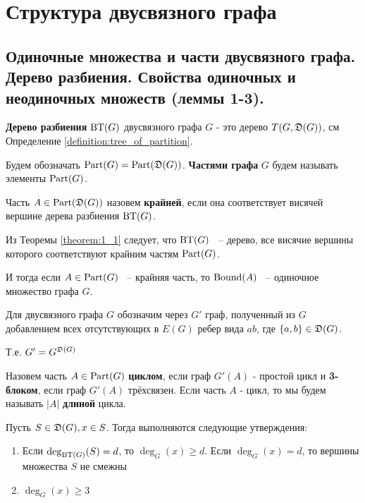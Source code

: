 
\section{Структура двусвязного графа}

\subsection{Одиночные множества и части двусвязного графа. Дерево разбиения. Свойства одиночных и неодиночных множеств (леммы 1-3).}


\begin{df*}
	\textbf{Дерево разбиения} $\operatorname{BT}(G)$ двусвязного графа  $G$ - это дерево  $T(G, \mathfrak{D}(G))$, см Определение \ref{definition:tree_of_partition}.

	Будем обозначать $\operatorname{Part}(G) = \operatorname{Part}(\mathfrak{D}(G))$.
	\textbf{Частями графа}  $G$ будем называть элементы  $\operatorname{Part}(G)$.
\end{df*}

\begin{df*}
	Часть $A \in \operatorname{Part}(\mathfrak{D}(G))$ назовем \textbf{крайней}, если она соответствует висячей вершине дерева разбиения  $\operatorname{BT}(G)$.
\end{df*}

Из Теоремы \ref{theorem:1_1} следует, что $\operatorname{BT}(G)$ ~-- дерево, все висячие вершины которого соответствуют крайним частям $\operatorname{Part}(G)$.

И тогда если $A \in \operatorname{Part}(G)$ ~-- крайняя часть, то $\operatorname{Bound}(A)$ ~-- одиночное множество графа $G$.

\begin{df*}[$G'$]
	Для двусвязного графа $G$ обозначим через $G'$ граф, полученный из $G$ добавлением всех отсутствующих в $E(G)$ ребер вида $ab$, где $\{a, b\} \in \mathfrak{D}(G)$.

	Т.е. $G' = G^{\mathfrak{D}(G)}$
\end{df*}

\begin{df*}
	Назовем часть $A \in \operatorname{Part}(G)$ \textbf{циклом}, если граф $G'(A)$ - простой цикл и \textbf{3-блоком}, если граф $G'(A)$ трёхсвязен.
	Если часть $A$ - цикл, то мы будем называть $|A|$ \textbf{длиной} цикла.
\end{df*}

\begin{customlm}{2.1} \label{lemma:2_1}
	Пусть $S \in \mathfrak{D}(G), x \in S$.
	Тогда выполняются следующие утверждения:
	 \begin{enumerate}
	\item Если $\deg_{\operatorname{BT}(G)}(S) = d$, то  $\deg_G(x) \geqslant d$.
		 Если  $\deg_G(x) = d$, то вершины множества  $S$ не смежны
	 \item $\deg_G(x) \geqslant 3$
	\end{enumerate}
\end{customlm}

